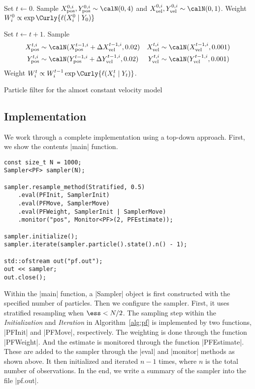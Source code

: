 \begin{algorithm}[t]
  \begin{algorithmic}
    \tophrule
    \STATE {}
    \STATE Set $t\leftarrow0$.
    \STATE Sample $\xpos^{0,i},\ypos^{0,i}\sim\calN(0,4)$ and
    $\xvel^{0,i},\yvel^{0,i}\sim\calN(0,1)$.
    \STATE Weight $W_i^0 \propto \exp\Curly{\ell(X_i^0 \mid Y_0)}$

    \REPEAT
    \STATE {}
    \STATE Set $t\leftarrow t + 1$.
    \STATE Sample
    \begin{align*}
      \xpos^{t,i}&\sim\calN(\xpos^{t-1,i} + \Delta\xvel^{t-1,i}, 0.02) &
      \xvel^{t,i}&\sim\calN(\xvel^{t-1,i}, 0.001) \\
      \ypos^{t,i}&\sim\calN(\ypos^{t-1,i} + \Delta\yvel^{t-1,i}, 0.02) &
      \yvel^{t,i}&\sim\calN(\yvel^{t-1,i}, 0.001)
    \end{align*}
    \STATE Weight $W_i^t \propto W_i^{t - 1}\exp\Curly{\ell(X_i^t \mid Y_t)}$.
    \bottomhrule
  \end{algorithmic}
  \caption{Particle filter for the almost constant velocity model}
  \label{alg:pf}
\end{algorithm}

\subsection{Implementation}
\label{sub:Implementation (PF)}

We work through a complete implementation using a top-down approach. First, we
show the contents |main| function.
\begin{verbatim}
const size_t N = 1000;
Sampler<PF> sampler(N);

sampler.resample_method(Stratified, 0.5)
    .eval(PFInit, SamplerInit)
    .eval(PFMove, SamplerMove)
    .eval(PFWeight, SamplerInit | SamplerMove)
    .monitor("pos", Monitor<PF>(2, PFEstimate));

sampler.initialize();
sampler.iterate(sampler.particle().state().n() - 1);

std::ofstream out("pf.out");
out << sampler;
out.close();
\end{verbatim}
Within the |main| function, a |Sampler| object is first constructed with the
specified number of particles. Then we configure the sampler. First, it  uses
stratified resampling when $\ess < N / 2$. The sampling step within the
\emph{Initialization} and \emph{Iteration} in Algorithm~\ref{alg:pf} is
implemented by two functions, |PFInit| and |PFMove|, respectively. The
weighting is done through the function |PFWeight|. And the estimate is
monitored through the function |PFEstimate|. These are added to the sampler
through the |eval| and |monitor| methods as shown above. It then initialized
and iterated $n - 1$ times, where $n$ is the total number of observations. In
the end, we write a summary of the sampler into the file |pf.out|.

